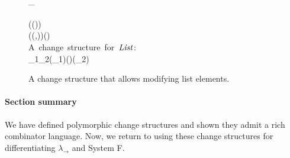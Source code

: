 \begin{figure}[h]
\begin{hscode}
\\[\blanklineskip]%
\>[B]{}\mathrel{:\mkern-1mu:}_{\mu}\;\to {}\;\<[E]%
\\
\>[B]{}\mathrel{=}\;\<[E]%
\\
\>[B]{}\<[3]%
\>[3]{}\;(\;())\mathrel{=}\<[E]%
\\
\>[B]{}\<[3]%
\>[3]{}\;(\;(,))\mathrel{=}\;\;(\;){}\<[E]%
\\[\blanklineskip]%
\>[B]{}\mbox{\onelinecomment  A change structure for \ensuremath{\Conid{List}}:}{}\<[E]%
\\
\>[B]{}\mathrel{:\mkern-1mu:}\;_{1}\;\;_{2}\to {}\;(\;_{1})\;(\;)\;(\;_{2}){}\<[E]%
\\
\>[B]{}\;\mathrel{=}\;\;\;\mathrel{\$}\;\<[E]%
\ColumnHook
\end{hscode}\resethooks

  \caption{A change structure that allows modifying list elements.}
  \label{fig:change-structure-list-w-combinators}
\end{figure}

\paragraph{Section summary}
We have defined polymorphic change structures and shown they admit a rich
combinator language. Now, we return to using these change structures for
differentiating \ensuremath{\lambda_{\to}} and System F.


